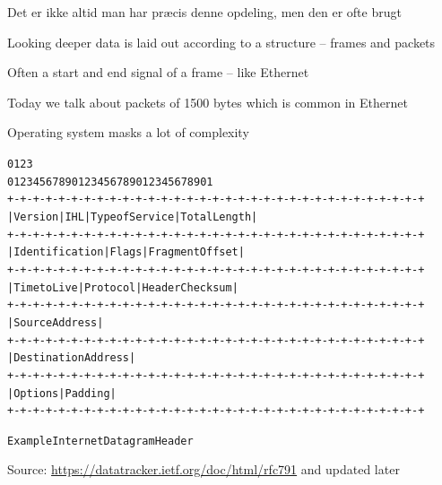 \documentclass[Screen16to9,17pt]{foils}
\begin{document}

\centerline{Det er ikke altid man har præcis denne opdeling, men den er ofte brugt}





\begin{list1}
\item Looking deeper data is laid out according to a structure -- frames and packets
\item Often a start and end signal of a frame -- like Ethernet
\item Today we talk about packets of 1500 bytes which is common in Ethernet
\item Operating system masks a lot of complexity
\end{list1}




\begin{alltt}\footnotesize
    0                   1                   2                   3
    0 1 2 3 4 5 6 7 8 9 0 1 2 3 4 5 6 7 8 9 0 1 2 3 4 5 6 7 8 9 0 1
   +-+-+-+-+-+-+-+-+-+-+-+-+-+-+-+-+-+-+-+-+-+-+-+-+-+-+-+-+-+-+-+-+
   |Version|  IHL  |Type of Service|          Total Length         |
   +-+-+-+-+-+-+-+-+-+-+-+-+-+-+-+-+-+-+-+-+-+-+-+-+-+-+-+-+-+-+-+-+
   |         Identification        |Flags|      Fragment Offset    |
   +-+-+-+-+-+-+-+-+-+-+-+-+-+-+-+-+-+-+-+-+-+-+-+-+-+-+-+-+-+-+-+-+
   |  Time to Live |    Protocol   |         Header Checksum       |
   +-+-+-+-+-+-+-+-+-+-+-+-+-+-+-+-+-+-+-+-+-+-+-+-+-+-+-+-+-+-+-+-+
   |                       Source Address                          |
   +-+-+-+-+-+-+-+-+-+-+-+-+-+-+-+-+-+-+-+-+-+-+-+-+-+-+-+-+-+-+-+-+
   |                    Destination Address                        |
   +-+-+-+-+-+-+-+-+-+-+-+-+-+-+-+-+-+-+-+-+-+-+-+-+-+-+-+-+-+-+-+-+
   |                    Options                    |    Padding    |
   +-+-+-+-+-+-+-+-+-+-+-+-+-+-+-+-+-+-+-+-+-+-+-+-+-+-+-+-+-+-+-+-+

                    Example Internet Datagram Header
\end{alltt}
Source: \url{https://datatracker.ietf.org/doc/html/rfc791} and updated later
\end{document}
